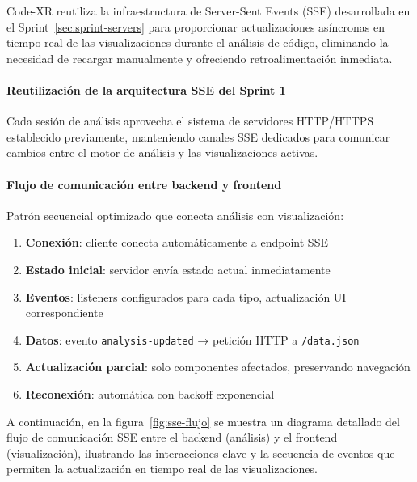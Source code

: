 \documentclass[a4paper, 12pt]{book}
\begin{document}
Code-XR reutiliza la infraestructura de Server-Sent Events (SSE) desarrollada en el Sprint~\ref{sec:sprint-servers} para proporcionar actualizaciones asíncronas en tiempo real de las visualizaciones durante el análisis de código, eliminando la necesidad de recargar manualmente y ofreciendo retroalimentación inmediata.

\paragraph{Reutilización de la arquitectura SSE del Sprint 1}
Cada sesión de análisis aprovecha el sistema de servidores HTTP/HTTPS establecido previamente, manteniendo canales SSE dedicados para comunicar cambios entre el motor de análisis y las visualizaciones activas.

\paragraph{Flujo de comunicación entre backend y frontend}
Patrón secuencial optimizado que conecta análisis con visualización:

\begin{enumerate}
  \item \textbf{Conexión}: cliente conecta automáticamente a endpoint SSE
  \item \textbf{Estado inicial}: servidor envía estado actual inmediatamente
  \item \textbf{Eventos}: listeners configurados para cada tipo, actualización UI correspondiente
  \item \textbf{Datos}: evento \texttt{analysis-updated} → petición HTTP a \texttt{/data.json}
  \item \textbf{Actualización parcial}: solo componentes afectados, preservando navegación
  \item \textbf{Reconexión}: automática con backoff exponencial
\end{enumerate}

A continuación, en la figura~\ref{fig:sse-flujo} se muestra un diagrama detallado del flujo de comunicación SSE entre el backend (análisis) y el frontend (visualización), ilustrando las interacciones clave y la secuencia de eventos que permiten la actualización en tiempo real de las visualizaciones.
\end{document}
